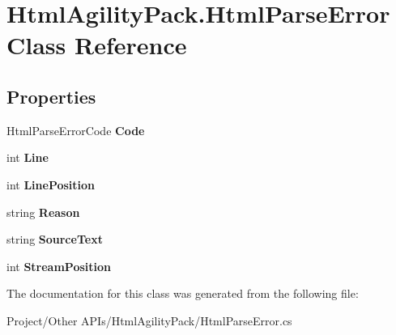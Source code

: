 \hypertarget{class_html_agility_pack_1_1_html_parse_error}{}\section{Html\+Agility\+Pack.\+Html\+Parse\+Error Class Reference}
\label{class_html_agility_pack_1_1_html_parse_error}
\subsection*{Properties}
\begin{DoxyCompactItemize}
\item 
\mbox{\label{class_html_agility_pack_1_1_html_parse_error_a68b06ae2e975f930dc9b512411b8535b}} 
Html\+Parse\+Error\+Code {\bfseries Code}
\item 
\mbox{\label{class_html_agility_pack_1_1_html_parse_error_a4868d0c19c5d2b1494705c520b7b93f8}} 
int {\bfseries Line}
\item 
\mbox{\label{class_html_agility_pack_1_1_html_parse_error_ad87338c4bf88e10577d695f08589d8f3}} 
int {\bfseries Line\+Position}
\item 
\mbox{\label{class_html_agility_pack_1_1_html_parse_error_a1ec38712fb915eab35334f933c528a12}} 
string {\bfseries Reason}
\item 
\mbox{\label{class_html_agility_pack_1_1_html_parse_error_acde8492c1173bb945b58b2978fe79b23}} 
string {\bfseries Source\+Text}
\item 
\mbox{\label{class_html_agility_pack_1_1_html_parse_error_ad225cae4703ea017eb132a0d2c7061e8}} 
int {\bfseries Stream\+Position}
\end{DoxyCompactItemize}


The documentation for this class was generated from the following file\+:\begin{DoxyCompactItemize}
\item 
Project/\+Other A\+P\+Is/\+Html\+Agility\+Pack/Html\+Parse\+Error.\+cs\end{DoxyCompactItemize}
